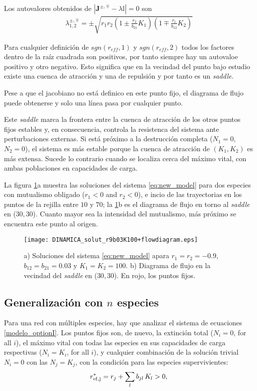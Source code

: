 Los autovalores obtenidos de $\left| \mathbf{J}^{\pm,\mp}-\lambda\mathbb{I}  \right|=0$ son
\begin{align*}
  \lambda^{\pm,\mp}_{1,2}= \pm \sqrt{r_1 r_2 \left(1\pm\frac{r_2}{b_{21}}K_1 \right)\left(1\mp\frac{r_1}{b_{12}}K_2 \right)}
\end{align*}

Para cualquier definición de $sgn(r_{eff},1)$ y $sgn(r_{eff},2)$ todos los factores dentro de la raíz cuadrada son positivos, por tanto siempre hay un autovaloe positivo y otro negativo. Esto significa que en la vecindad del punto bajo estudio existe una cuenca de atracción y una de repulsión y por tanto es un \textit{saddle}.

Pese a que el jacobiano no está definico en este punto fijo, el diagrama de flujo puede obtenerse y solo una línea pasa por cualquier punto.

Este \textit{saddle} marca la frontera entre la cuenca de atracción de los otros puntos fijos estables y, en consecuencia, controla la resistenca del sistema ante perturbaciones externas. Si está próximo a la destrucción completa ($N_1=0$,$N_2=0$), el sistema es más estable porque la cuenca de atracción de $(K_1,K_2)$ es más extensa. Sucede lo contrario cuando se localiza cerca del máximo vital, con ambas poblaciones en capacidades de carga.

La figura \ref{fig:stab1_phase}a muestra las soluciones del sistema \ref{eq:new_model} para dos especies con mutualismo obligado ($r_1<0$ and $r_2<0$), e incio de las trayectorias en los puntos de la rejilla entre $10$ y $70$; la \ref{fig:stab1_phase}b es el diagrama de flujo en torno al \textit{saddle} en ($30,30$). Cuanto mayor sea la intensidad del mutualismo, más próximo se encuentra este punto al origen.

\begin{figure}
\centering
\texttt{[image: DINAMICA\_solut\_r9b03K100+flowdiagram.eps]}
\caption {a) Soluciones del sistema \ref{eq:new_model} apara $r_1=r_2=-0.9$, $b_{12}=b_{21}=0.03$ y $K_1=K_2=100$. b) Diagrama de flujo en la vecindad del \textit{saddle} en ($30,30$). En rojo, los puntos fijos.}
\label{fig:stab1_phase}
\end{figure}

\subsection{Generalización con $n$ especies}

Para una red con múltiples especies, hay que analizar el sistema de ecuaciones \ref{modelo_optionI}. Los puntos fijos son, de nuevo, la extinción total ($N_i=0$, for all $i$), el máximo vital con todas las especies en sus capacidades de carga respectivas ($N_i=K_i$, for all $i$), y cualquier combinación de la solución trivial $N_{i}=0$ con las $N_{j}= K_{j}$, con la condición para las especies supervivientes:
\begin{equation}
\displaystyle r_{\rm{ef},j}^{\ast} = r_{j} + \sum_{l} b_{jl}\, K_{l} > 0 \\,
\label{eq:condit_reff_K}
\end{equation}

